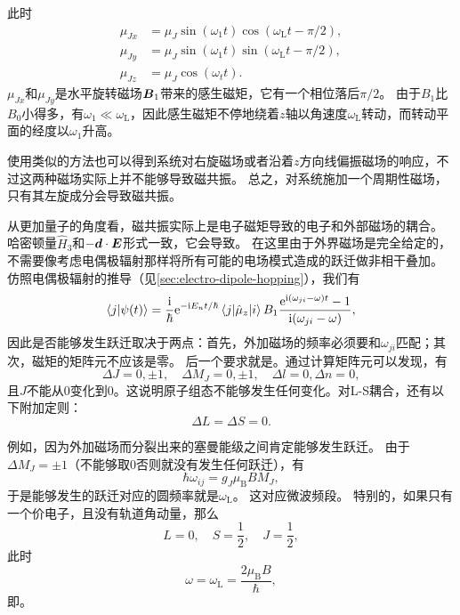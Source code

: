 此时
\begin{equation}
    \begin{aligned}
        \mu_{Jx} &= \mu_J \sin(\omega_1 t) \cos(\omega_\text{L} t - \pi / 2), \\
        \mu_{Jy} &= \mu_J \sin(\omega_1 t) \sin(\omega_\text{L} t - \pi / 2), \\
        \mu_{Jz} &= \mu_J \cos(\omega_t t).
    \end{aligned}
    \label{eq:rotating-spin}
\end{equation}
$\mu_{Jx}$和$\mu_{Jy}$是水平旋转磁场$\vb*{B}_1$带来的感生磁矩，它有一个相位落后$\pi / 2$。
由于$B_1$比$B_0$小得多，有$\omega_1 \ll \omega_\text{L}$，因此感生磁矩不停地绕着$z$轴以角速度$\omega_\text{L}$转动，而转动平面的经度以$\omega_1$升高。

使用类似的方法也可以得到系统对右旋磁场或者沿着$z$方向线偏振磁场的响应，不过这两种磁场实际上并不能够导致磁共振。
总之，对系统施加一个周期性磁场，只有其左旋成分会导致磁共振。

从更加量子的角度看，磁共振实际上是电子磁矩导致的电子和外部磁场的耦合。
哈密顿量$\hat{H}_3$和$-\vb*{d} \cdot \vb*{E}$形式一致，它会导致。
在这里由于外界磁场是完全给定的，不需要像考虑电偶极辐射那样将所有可能的电场模式造成的跃迁做非相干叠加。
仿照电偶极辐射的推导（见\autoref{sec:electro-dipole-hopping}），我们有%
\[
    \braket{j}{\psi(t)} = \frac{\mathrm{i}}{\hbar} \mathrm{e}^{-\mathrm{i} E_n t / \hbar} \mel{j}{\hat{\mu}_z}{i} B_1 \frac{\mathrm{e}^{\mathrm{i}(\omega_{ji}-\omega) t} - 1}{\mathrm{i} (\omega_{ji} - \omega)},
\]
因此是否能够发生跃迁取决于两点：首先，外加磁场的频率必须要和$\omega_{ji}$匹配；其次，磁矩的矩阵元不应该是零。
后一个要求就是。通过计算矩阵元可以发现，有
\begin{equation}
    \Delta J = 0, \pm 1, \quad \Delta M_J = 0, \pm 1, \quad \Delta l = 0, \Delta n = 0,
\end{equation}
且$J$不能从$0$变化到$0$。这说明原子组态不能够发生任何变化。对L-S耦合，还有以下附加定则：
\begin{equation}
    \Delta L = \Delta S = 0.
\end{equation}

例如，因为外加磁场而分裂出来的塞曼能级之间肯定能够发生跃迁。
由于$\Delta M_J=\pm 1$（不能够取$0$否则就没有发生任何跃迁），有
\[
    \hbar \omega_{ij} = g_J \mu_\text{B} B M_J,
\]
于是能够发生的跃迁对应的圆频率就是$\omega_\text{L}$。
这对应微波频段。
特别的，如果只有一个价电子，且没有轨道角动量，那么
\[
    L = 0, \quad S = \frac{1}{2}, \quad J = \frac{1}{2},
\]
此时
\begin{equation}
    \omega = \omega_\text{L} = \frac{2 \mu_\text{B} B}{\hbar},
\end{equation}
即。

